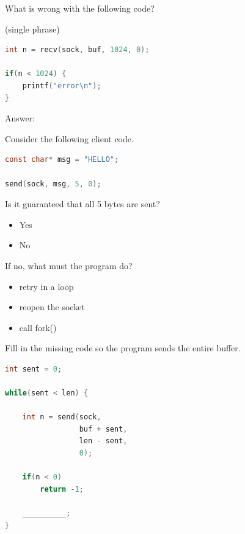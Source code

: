 \begin{questions}
	What is wrong with the following code?

	(single phrase)

	\begin{lstlisting}[language=C]
int n = recv(sock, buf, 1024, 0);

if(n < 1024) {
    printf("error\n");
}
\end{lstlisting}

	Answer:

	\vspace{2cm}

	\question[10]

	Consider the following client code.

	\begin{lstlisting}[language=C]
const char* msg = "HELLO";

send(sock, msg, 5, 0);
\end{lstlisting}

	Is it guaranteed that all 5 bytes are sent?

	\begin{itemize}
		\item Yes
		\item No
	\end{itemize}

	If no, what must the program do?

	\begin{itemize}
		\item retry in a loop
		\item reopen the socket
		\item call fork()
	\end{itemize}

	\question[10]

	Fill in the missing code so the program sends the entire buffer.

	\begin{lstlisting}[language=C]
int sent = 0;

while(sent < len) {

    int n = send(sock,
                 buf + sent,
                 len - sent,
                 0);

    if(n < 0)
        return -1;

    __________;
}
\end{lstlisting}

	\vspace{1cm}


\end{questions}
